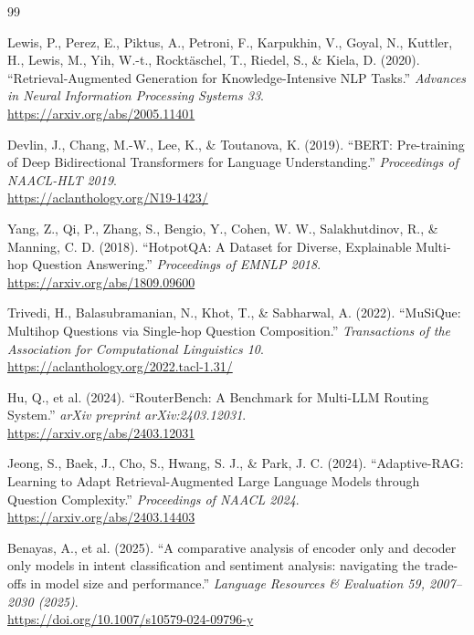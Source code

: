 \documentclass[11pt, a4paper]{article}
\begin{document}
\begin{thebibliography}{99}

Lewis, P., Perez, E., Piktus, A., Petroni, F., Karpukhin, V., Goyal, N., Kuttler, H., Lewis, M., Yih, W.-t., Rockt\"aschel, T., Riedel, S., \& Kiela, D. (2020).
``Retrieval-Augmented Generation for Knowledge-Intensive NLP Tasks.''
\textit{Advances in Neural Information Processing Systems 33}. \\
\url{https://arxiv.org/abs/2005.11401}

Devlin, J., Chang, M.-W., Lee, K., \& Toutanova, K. (2019).
``BERT: Pre-training of Deep Bidirectional Transformers for Language Understanding.''
\textit{Proceedings of NAACL-HLT 2019}. \\
\url{https://aclanthology.org/N19-1423/}

Yang, Z., Qi, P., Zhang, S., Bengio, Y., Cohen, W. W., Salakhutdinov, R., \& Manning, C. D. (2018).
``HotpotQA: A Dataset for Diverse, Explainable Multi-hop Question Answering.''
\textit{Proceedings of EMNLP 2018}. \\
\url{https://arxiv.org/abs/1809.09600}

Trivedi, H., Balasubramanian, N., Khot, T., \& Sabharwal, A. (2022).
``MuSiQue: Multihop Questions via Single-hop Question Composition.''
\textit{Transactions of the Association for Computational Linguistics 10}. \\
\url{https://aclanthology.org/2022.tacl-1.31/}

Hu, Q., et al. (2024).
``RouterBench: A Benchmark for Multi-LLM Routing System.''
\textit{arXiv preprint arXiv:2403.12031}. \\
\url{https://arxiv.org/abs/2403.12031}

Jeong, S., Baek, J., Cho, S., Hwang, S. J., \& Park, J. C. (2024).
``Adaptive-RAG: Learning to Adapt Retrieval-Augmented Large Language Models through Question Complexity.''
\textit{Proceedings of NAACL 2024}. \\
\url{https://arxiv.org/abs/2403.14403}

Benayas, A., et al. (2025).
``A comparative analysis of encoder only and decoder only models in intent classification and sentiment analysis: navigating the trade-offs in model size and performance.''
\textit{Language Resources \& Evaluation 59, 2007--2030 (2025)}. \\
\url{https://doi.org/10.1007/s10579-024-09796-y}


\end{thebibliography}
\end{document}
